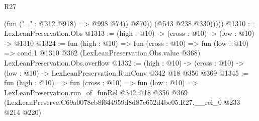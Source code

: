 \begin{lexlean}{R27}
\begin{coremodule}
                  (fun ("_" : @312 @918) => @998 @74))
                @870))
            (@543 @238 @330)))))
@1310 := LexLeanPreservation.Obs
@1313 := (high : @10) -> (cross : @10) -> (low : @10) -> @1310
@1324 := fun (high : @10) =>
  fun (cross : @10) =>
  fun (low : @10) =>
  cond.{1} @1310 @362 (LexLeanPreservation.Obs.value @368) LexLeanPreservation.Obs.overflow
@1332 := (high : @10) ->
  (cross : @10) -> (low : @10) -> LexLeanPreservation.RunConv @342 @18 @356 @369
@1345 := fun (high : @10) =>
  fun (cross : @10) =>
  fun (low : @10) =>
  LexLeanPreservation.run_of_funRel
    @342
    @18
    @356
    @369
    (LexLeanPreserve.C69a0078cb8f644959d8d87c652d4be05.R27.__rel_0 @233 @214 @220)
\end{coremodule}
\end{lexlean}

